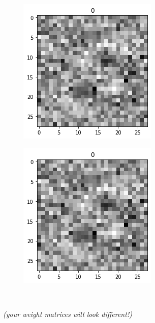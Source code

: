 \documentclass[a4paper,10pt]{article}
\begin{document}
\begin{figure}[H]
\begin{subfigure}[b]{0.24\textwidth}
		\end{subfigure}
		\begin{subfigure}[b]{0.24\textwidth}
			\centering
			\includegraphics[width=\textwidth]{weights0}
		\end{subfigure}
		\begin{subfigure}[b]{0.24\textwidth}
			\centering
			\includegraphics[width=\textwidth]{weights0}
		\end{subfigure}\\
		\caption{\textit{(your weight matrices will look different!)}}
		\label{fig:weights}
	\end{figure}
	
\end{document}
